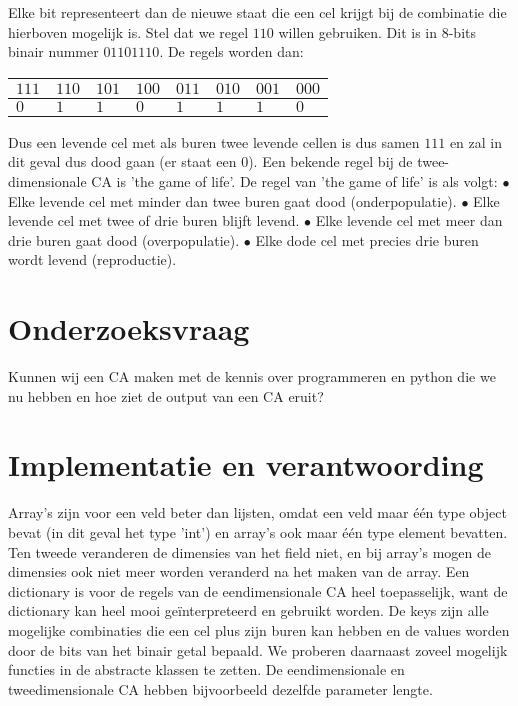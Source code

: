 \documentclass[12pt,a4paper]{article}
\begin{document}
Elke bit representeert dan de nieuwe staat die een cel krijgt bij de combinatie die hierboven mogelijk is.
Stel dat we regel $110$ willen gebruiken. Dit is in 8-bits binair nummer $01101110$.
De regels worden dan:
\begin{center}
\begin{tabular}{|m{0.6cm}|m{0.6cm}|m{0.6cm}|m{0.6cm}|m{0.6cm}|m{0.6cm}|m{0.6cm}|m{0.6cm}|}
    \hline
    $111$ & $110$ & $101$ & $100$ & $011$ & $010$ & $001$ & $000$ \\
    \hline
    $0$ & $1$ & $1$ & $0$ & $1$ & $1$ & $1$ & $0$ \\
    \hline
\end{tabular}
\end{center}
\vspace{10pt}
Dus een levende cel met als buren twee levende cellen is dus samen $111$ en zal in dit geval dus dood gaan (er staat een $0$).
Een bekende regel bij de twee-dimensionale CA is 'the game of life'. 
\newline
De regel van 'the game of life' is als volgt:
\vspace{4pt}
\newline
$\bullet$ Elke levende cel met minder dan twee buren gaat dood (onderpopulatie). 
\newline 
$\bullet$ Elke levende cel met twee of drie buren blijft levend.
\newline
$\bullet$ Elke levende cel met meer dan drie buren gaat dood (overpopulatie).
\newline 
$\bullet$ Elke dode cel met precies drie buren wordt levend (reproductie).
\newline
\section*{Onderzoeksvraag}
Kunnen wij een CA maken met de kennis over programmeren en python die we nu hebben 
en hoe ziet de output van een CA eruit?

\section*{Implementatie en verantwoording}
Array's zijn voor een veld beter dan lijsten, omdat een veld maar één type object bevat (in dit geval het type 'int') 
en array's ook maar één type element bevatten.  
Ten tweede veranderen de dimensies van het field niet, en bij array's mogen de dimensies ook niet meer worden veranderd na
het maken van de array. Een dictionary is voor de regels van de eendimensionale CA heel toepasselijk, want 
de dictionary kan heel mooi geïnterpreteerd en gebruikt worden. 
De keys zijn alle mogelijke combinaties die een cel plus zijn buren kan hebben
en de values worden door de bits van het binair getal bepaald. 
We proberen daarnaast zoveel mogelijk functies in de abstracte klassen te zetten.
De eendimensionale en tweedimensionale CA hebben bijvoorbeeld dezelfde parameter lengte.   
\end{document}
